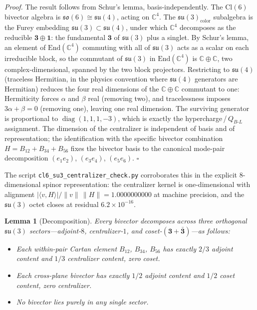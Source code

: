 \documentclass[aip,jmp,amsmath,amssymb,reprint,author-year]{revtex4-2}
\newtheorem{lemma}[theorem]{Lemma}
\newenvironment{proof}[1][Proof]{\par\noindent\textit{#1.}\space\ignorespaces}{\hfill$\square$\par\medskip}
\begin{document}
\begin{proof}
The result follows from Schur's lemma, basis-independently.  The
$\mathrm{Cl}(6)$ bivector algebra is
$\mathfrak{so}(6) \cong \mathfrak{su}(4)$, acting on $\mathbb{C}^4$.
The $\mathfrak{su}(3)_{\mathrm{color}}$ subalgebra is the Furey embedding
$\mathfrak{su}(3) \subset \mathfrak{su}(4)$, under which $\mathbb{C}^4$
decomposes as the reducible $\mathbf{3} \oplus \mathbf{1}$: the
fundamental $\mathbf{3}$ of $\mathfrak{su}(3)$ plus a singlet.  By
Schur's lemma, an element of $\mathrm{End}(\mathbb{C}^4)$ commuting with
all of $\mathfrak{su}(3)$ acts as a scalar on each irreducible block, so
the commutant of $\mathfrak{su}(3)$ in $\mathrm{End}(\mathbb{C}^4)$ is
$\mathbb{C} \oplus \mathbb{C}$, two complex-dimensional, spanned by the
two block projectors.  Restricting to $\mathfrak{su}(4)$ (traceless
Hermitian, in the physics convention where $\mathfrak{su}(4)$ generators
are Hermitian) reduces the four real dimensions of the
$\mathbb{C} \oplus \mathbb{C}$ commutant to one: Hermiticity forces
$\alpha$ and $\beta$ real (removing two), and tracelessness imposes
$3\alpha + \beta = 0$ (removing one), leaving one real dimension.  The
surviving generator is proportional to $\operatorname{diag}(1,1,1,-3)$,
which is exactly the hypercharge\,/\,$Q_{B\text{-}L}$ assignment.  The
dimension of the centralizer is independent of basis and of
representation; the identification with the specific bivector combination
$H = B_{12} + B_{34} + B_{56}$ fixes the bivector basis to the canonical
mode-pair decomposition $(e_1 e_2)$, $(e_3 e_4)$, $(e_5 e_6)$.
\end{proof}

The script \texttt{cl6\_su3\_centralizer\_check.py} corroborates this in
the explicit 8-dimensional spinor representation: the centralizer kernel
is one-dimensional with alignment
$|\langle v, H\rangle|/\|v\|\,\|H\| = 1.0000000000$ at machine
precision, and the $\mathfrak{su}(3)$ octet closes at residual
$6.2 \times 10^{-16}$.

\begin{lemma}[Decomposition]
\label{lem:decomposition}
Every bivector decomposes across three orthogonal\/ $\mathfrak{su}(3)$
sectors---adjoint-$8$, centralizer-$1$, and coset-$(\mathbf{3} +
\bar{\mathbf{3}})$---as follows:
\begin{itemize}
\item Each within-pair Cartan element $B_{12}$, $B_{34}$, $B_{56}$ has
  exactly $2/3$ adjoint content and $1/3$ centralizer content, zero coset.
\item Each cross-plane bivector has exactly $1/2$ adjoint content and
  $1/2$ coset content, zero centralizer.
\item No bivector lies purely in any single sector.
\end{itemize}
\end{lemma}
\end{document}
